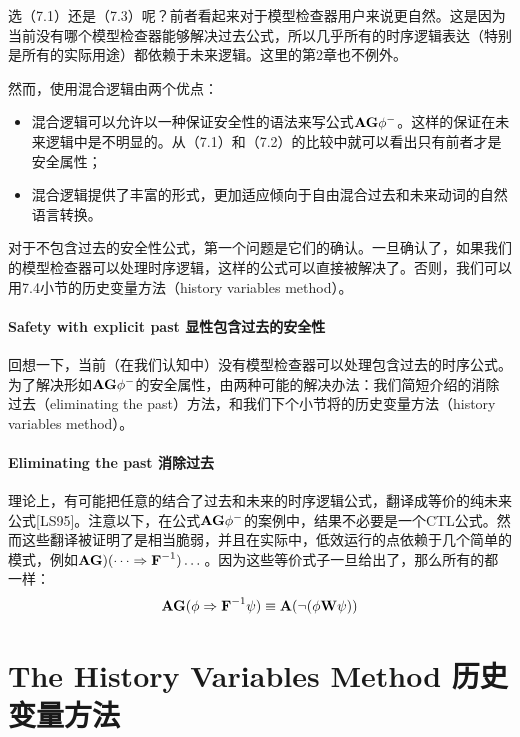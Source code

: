 \documentclass{book}
\begin{document}
    选（7.1）还是（7.3）呢？前者看起来对于模型检查器用户来说更自然。这是因为当前没有哪个模型检查器能够解决过去公式，所以几乎所有的时序逻辑表达（特别是所有的实际用途）都依赖于未来逻辑。这里的第2章也不例外。

    然而，使用混合逻辑由两个优点：
    \begin{itemize}
      \item 混合逻辑可以允许以一种保证安全性的语法来写公式$\text{\textbf{AG}}\phi^-$。这样的保证在未来逻辑中是不明显的。从（7.1）和（7.2）的比较中就可以看出只有前者才是安全属性；
      \item 混合逻辑提供了丰富的形式，更加适应倾向于自由混合过去和未来动词的自然语言转换。
    \end{itemize}

    对于不包含过去的安全性公式，第一个问题是它们的确认。一旦确认了，如果我们的模型检查器可以处理时序逻辑，这样的公式可以直接被解决了。否则，我们可以用7.4小节的历史变量方法（history variables method）。

    \paragraph{Safety with explicit past 显性包含过去的安全性} 回想一下，当前（在我们认知中）没有模型检查器可以处理包含过去的时序公式。为了解决形如$\text{\textbf{AG}}\phi^-$的安全属性，由两种可能的解决办法：我们简短介绍的消除过去（eliminating the past）方法，和我们下个小节将的历史变量方法（history variables method）。

    \paragraph{Eliminating the past 消除过去} 理论上，有可能把任意的结合了过去和未来的时序逻辑公式，翻译成等价的纯未来公式[LS95]。注意以下，在公式$\text{\textbf{AG}}\phi^-$的案例中，结果不必要是一个CTL公式。然而这些翻译被证明了是相当脆弱，并且在实际中，低效运行的点依赖于几个简单的模式，例如$\text{\textbf{AG}})(\dots\Rightarrow\text{\textbf{F}}^{-1})\dots$。因为这些等价式子一旦给出了，那么所有的都一样：
    \begin{equation*}
      \text{\textbf{AG}}(\phi\Rightarrow\text{\textbf{F}}^{-1}\psi)\equiv\text{\textbf{A}}(\neg(\phi\text{\textbf{W}}\psi))
    \end{equation*}

    \section{The History Variables Method 历史变量方法}
\end{document}
